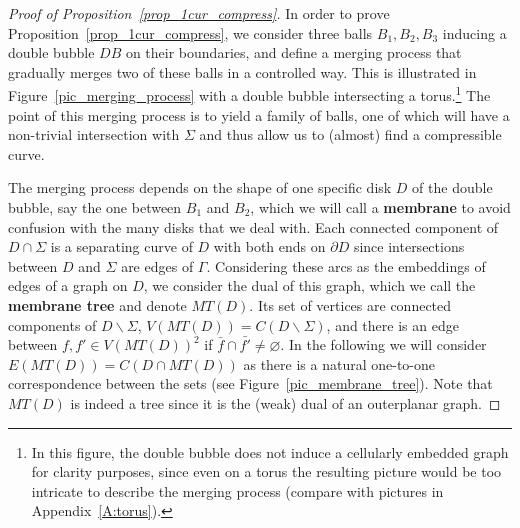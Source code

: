 \documentclass[11pt,a4paper]{article}
\newcommand{\bfdex}[1]{\textbf{#1}\index{#1}}
\begin{document}
\begin{proof}[Proof of Proposition~\ref{prop_1cur_compress}] In order to prove Proposition~\ref{prop_1cur_compress}, we consider three balls $B_1,B_2,B_3$ inducing a double bubble $DB$ on their boundaries, and define a merging process that gradually merges two of these balls in a controlled way. This is illustrated in Figure~\ref{pic_merging_process} with a double bubble intersecting a torus.\footnote{In this figure, the double bubble does not induce a cellularly embedded graph for clarity purposes, since even on a torus the resulting picture would be too intricate to describe the merging process (compare with pictures in Appendix~\ref{A:torus}).} The point of this merging process is to yield a family of balls, one of which will have a non-trivial intersection with $\Sigma$ and thus allow us to (almost) find a compressible curve.

The merging process depends on the shape of one specific disk $D$ of the double bubble, say the one between $B_1$ and $B_2$, which we will call a \bfdex{membrane} to avoid confusion with the many disks that we deal with. Each connected component of $D \cap \Sigma$ is a separating curve of $D$ with both ends on $\partial D$ since intersections between $D$ and $\Sigma$ are edges of $\Gamma$. Considering these arcs as the embeddings of edges of a graph on $D$, we consider the dual of this graph, which we call the \bfdex{membrane tree} and denote $MT(D)$. Its set of vertices are connected components of $D \smallsetminus \Sigma$, $V(MT(D)) = C(D \smallsetminus \Sigma)$, and there is an edge between $f,f' \in V(MT(D))^2$ if $\bar f  \cap \bar{f'} \neq \varnothing$. In the following we will consider $E(MT(D)) = C(D \cap MT(D))$ as there is a natural one-to-one correspondence between the sets (see Figure~\ref{pic_membrane_tree}). Note that $MT(D)$ is indeed a tree since it is the (weak) dual of an outerplanar graph. 


\end{proof}
\end{document}
